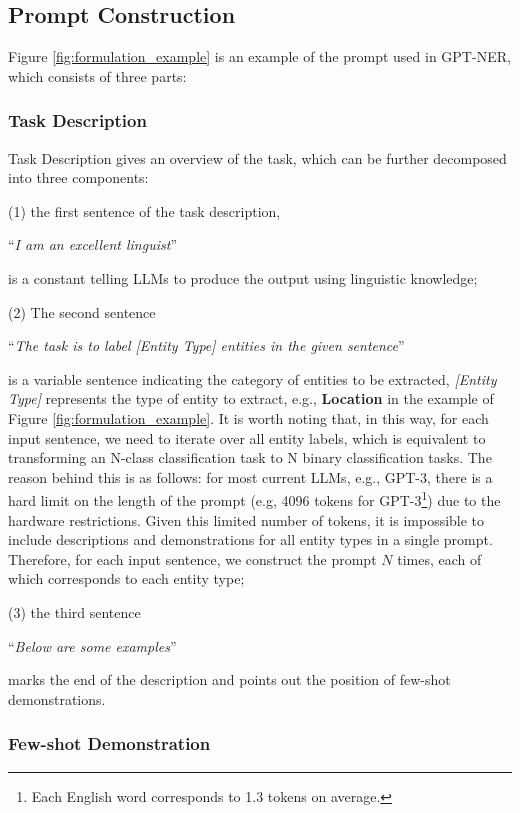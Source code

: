 \documentclass[11pt]{article}
\begin{document}
\subsection{Prompt Construction}
\label{prompt_construction}

Figure \ref{fig:formulation_example} is an example of the prompt used in GPT-NER,
which consists of three parts:

\subsubsection{Task Description}
 Task Description gives an overview of the task, which can be further decomposed into three components:

(1)  the first sentence of the task description,

“\textit{I am an excellent linguist}”

\noindent is a constant telling LLMs to produce the output using linguistic knowledge;

(2)  The second sentence 

“\textit{The task is to label [Entity Type] entities in the given sentence}” 

\noindent is a variable sentence indicating the category of entities to be extracted, 
\textit{[Entity Type]} represents the type of entity to extract, e.g., \textbf{Location} in the example of Figure \ref{fig:formulation_example}.
It is worth noting that, in this way, for each input sentence, we need to iterate over all entity labels, which is equivalent to transforming an N-class classification task to N binary classification tasks. The reason behind this is as follows:
for most current LLMs, e.g., GPT-3, there is a hard limit on the length of the prompt (e.g, 4096 tokens for GPT-3\footnote{Each English word corresponds to 1.3 tokens on average.}) due to the hardware restrictions.
Given this limited number of tokens, 
it is  impossible to include descriptions and demonstrations
for all entity types in a single prompt. 
Therefore, for each input sentence, we construct the prompt $N$ times, each of which corresponds to each entity type;

(3) the third sentence 

“\textit{Below are some examples}” 

\noindent marks the end of the description and points out the position of few-shot demonstrations.

\subsubsection{Few-shot Demonstration}
\label{few_shot_demonstration}
\end{document}

